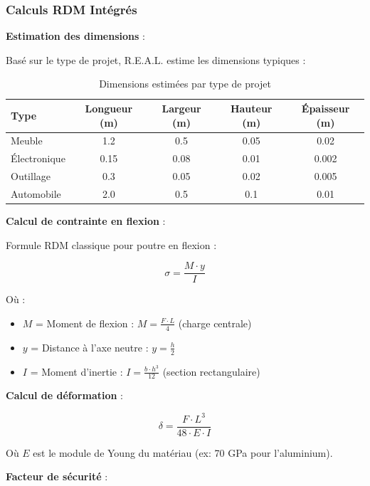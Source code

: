 \subsubsection{Calculs RDM Intégrés}

\textbf{Estimation des dimensions} :

Basé sur le type de projet, R.E.A.L. estime les dimensions typiques :

\begin{table}[H]
\centering
\caption{Dimensions estimées par type de projet}
\label{tab:dimensions}
\begin{tabular}{@{}lcccc@{}}
\toprule
\textbf{Type} & \textbf{Longueur (m)} & \textbf{Largeur (m)} & \textbf{Hauteur (m)} & \textbf{Épaisseur (m)} \\ 
\midrule
Meuble & 1.2 & 0.5 & 0.05 & 0.02 \\
Électronique & 0.15 & 0.08 & 0.01 & 0.002 \\
Outillage & 0.3 & 0.05 & 0.02 & 0.005 \\
Automobile & 2.0 & 0.5 & 0.1 & 0.01 \\
\bottomrule
\end{tabular}
\end{table}

\textbf{Calcul de contrainte en flexion} :

Formule RDM classique pour poutre en flexion :

\begin{equation}
\sigma = \frac{M \cdot y}{I}
\end{equation}

Où :
\begin{itemize}[leftmargin=*]
    \item $M$ = Moment de flexion : $M = \frac{F \cdot L}{4}$ (charge centrale)
    \item $y$ = Distance à l'axe neutre : $y = \frac{h}{2}$
    \item $I$ = Moment d'inertie : $I = \frac{b \cdot h^3}{12}$ (section rectangulaire)
\end{itemize}

\textbf{Calcul de déformation} :

\begin{equation}
\delta = \frac{F \cdot L^3}{48 \cdot E \cdot I}
\end{equation}

Où $E$ est le module de Young du matériau (ex: 70 GPa pour l'aluminium).

\textbf{Facteur de sécurité} :

